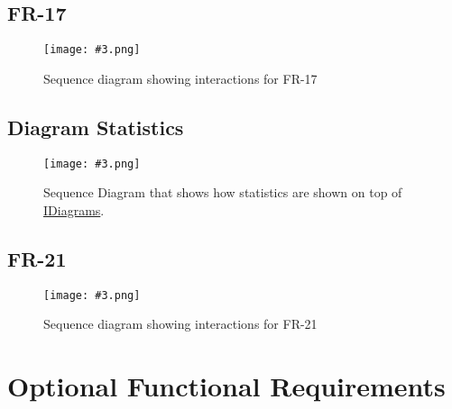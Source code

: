 \documentclass[10pt,a4paper]{report}
\newcommand{\refer}[2]{\hyperref[#1]{\textcolor{col:reference}{#2}}}
\newcommand{\includeimage}[5]{
    \begin{figure}[H]
        #1
        \texttt{[image: \#3.png]}
        \caption{#4}
        \label{fig:#5}
    \end{figure}
}
\newcommand{\packagebeginning}{edu.kit.informatik.pse.gelf} %
\newcommand{\lblroot}{lbl} %
\newcommand{\lblpackage}{} %
\newcommand{\lblpackageelement}{} %
\newcommand{\lblpackageelementmember}{} %
\newcommand{\lblpackageelementmemberparameter}{} %
\newcommand{\casclabelname}{\lblroot\lblpackage\lblpackageelement\lblpackageelementmember\lblpackageelementmemberparameter}
\newcommand{\casclabel}{\label{\casclabelname}}
\begin{document}
\subsection{FR-17}
\includeimage{}{0.35}{scalingvalues}{Sequence diagram showing interactions for FR-17}{Scaling Values}
\subsection{Diagram Statistics}
\includeimage{}{0.30}{DiagramStatistics}{Sequence Diagram that shows how statistics are shown on top of \refer{\lblroot:view.diagrams:IDiagram}{IDiagrams}.}{Diagram Statistics}
\subsection{FR-21}
\includeimage{}{0.35}{FR-21}{Sequence diagram showing interactions for FR-21}{Saving a Library as a new File}
\section{Optional Functional Requirements}
\end{document}
